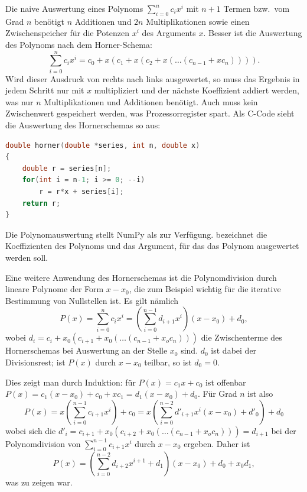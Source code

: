 Die naive Auswertung eines Polynoms $\sum_{i=0}^{n} c_ix^{i}$ mit
$n+1$ Termen bzw.\ vom Grad $n$ benötigt $n$ Additionen und $2n$
Multiplikationen sowie einen Zwischenspeicher für die Potenzen $x^i$
des Arguments $x$. Besser ist die Auswertung des Polynoms nach dem
Horner-Schema:
\begin{equation}
  \label{eq:horner}
  \sum_{i=0}^{n} c_ix^{i} = c_0 + x(c_1 + x(c_2 + x(\ldots (c_{n-1} + x c_{n})))).
\end{equation}
Wird dieser Ausdruck von rechts nach links ausgewertet, so muss das
Ergebnis in jedem Schritt nur mit $x$ multipliziert und der nächste
Koeffizient addiert werden, was nur $n$ Multiplikationen und
Additionen benötigt. Auch muss kein Zwischenwert gespeichert werden,
was Prozessorregister spart. Als C-Code sieht die Auswertung des
Hornerschemas so aus:
\begin{lstlisting}[language=C]
double horner(double *series, int n, double x)
{
    double r = series[n];
    for(int i = n-1; i >= 0; --i)
        r = r*x + series[i];
    return r;
}
\end{lstlisting}
\sloppypar Die Polynomauswertung stellt NumPy als
 zur Verfügung.  bezeichnet die
Koeffizienten des Polynoms und  das Argument, für das das
Polynom ausgewertet werden soll.

Eine weitere Anwendung des Hornerschemas ist die Polynomdivision durch
lineare Polynome der Form $x-x_0$, die zum Beispiel wichtig für die
iterative Bestimmung von Nullstellen ist. Es gilt nämlich
\begin{equation}
  \label{eq:polynomdiv}
  P(x) = \sum_{i=0}^{n} c_ix^{i} = 
  \left(\sum_{i=0}^{n-1} d_{i+1}x^{i}\right)(x-x_0) + d_0,
\end{equation}
wobei $d_i = c_i + x_0(c_{i+1} + x_0(\ldots (c_{n-1} + x_o c_n)))$ die
Zwischenterme des Hornerschemas bei Auswertung an der Stelle $x_0$
sind. $d_0$ ist dabei der Divisionsrest; ist $P(x)$ durch $x-x_0$
teilbar, so ist $d_0=0$. 

Dies zeigt man durch Induktion: für $P(x) = c_1 x + c_0$ ist offenbar
$P(x) = c_1(x-x_0) + c_0 + x c_1 = d_1(x-x_0) + d_0$. Für Grad $n$ ist
also
\begin{equation}
    P(x) = x \left(\sum_{i=0}^{n-1} c_{i+1}x^{i}\right) + c_0
    = x\left(\sum_{i=0}^{n-2} d'_{i+1}x^{i}(x-x_0) + d'_0\right) +
    d_0
\end{equation}
wobei sich die $d'_i = c_{i+1} + x_0(c_{i+2} + x_0(\ldots (c_{n-1} +
x_o c_n))) = d_{i+1}$ bei der Polynomdivision von $\sum_{i=0}^{n-1}
c_{i+1}x^{i}$ durch $x-x_0$ ergeben. Daher ist
\begin{equation}
    P(x) = \left(\sum_{i=0}^{n-2} d_{i+2}x^{i+1} + d_1\right)(x-x_0) +
    d_0 + x_0 d_1,
\end{equation}
was zu zeigen war.

